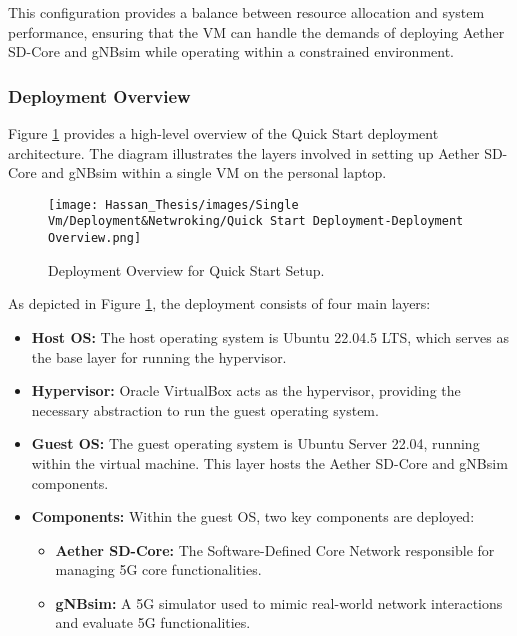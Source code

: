 This configuration provides a balance between resource allocation and system performance, ensuring that the VM can handle the demands of deploying Aether SD-Core and gNBsim while operating within a constrained environment.

\subsubsection{Deployment Overview}

Figure \ref{fig:quick-start-deployment-overview} provides a high-level overview of the Quick Start deployment architecture. The diagram illustrates the layers involved in setting up Aether SD-Core and gNBsim within a single VM on the personal laptop.

\begin{figure}[!htb]
    \centering
    \texttt{[image: Hassan\_Thesis/images/Single Vm/Deployment\&Netwroking/Quick Start Deployment-Deployment Overview.png]}
    \caption{Deployment Overview for Quick Start Setup.}
    \label{fig:quick-start-deployment-overview}
\end{figure}

As depicted in Figure \ref{fig:quick-start-deployment-overview}, the deployment consists of four main layers:

\begin{itemize}
    \item \textbf{Host OS:} The host operating system is Ubuntu 22.04.5 LTS, which serves as the base layer for running the hypervisor.
    \item \textbf{Hypervisor:} Oracle VirtualBox acts as the hypervisor, providing the necessary abstraction to run the guest operating system.
    \item \textbf{Guest OS:} The guest operating system is Ubuntu Server 22.04, running within the virtual machine. This layer hosts the Aether SD-Core and gNBsim components.
    \item \textbf{Components:} Within the guest OS, two key components are deployed:
    \begin{itemize}
        \item \textbf{Aether SD-Core:} The Software-Defined Core Network responsible for managing 5G core functionalities.
        \item \textbf{gNBsim:} A 5G simulator used to mimic real-world network interactions and evaluate 5G functionalities.
    \end{itemize}
\end{itemize}

